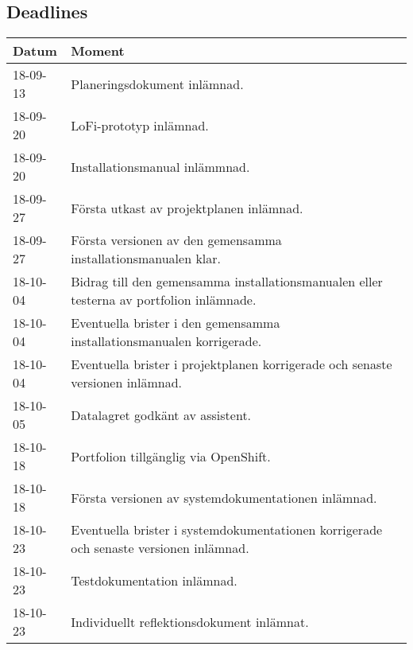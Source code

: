\documentclass{TDP003mall}
\begin{document}
\subsection{Deadlines}
\begin{table}[!h]
\begin{tabularx}{\linewidth}{|l|X|}\hline
    \textbf{Datum} & \textbf{Moment} \\\hline
    18-09-13 & Planeringsdokument inlämnad. \\\hline
    18-09-20 & LoFi-prototyp inlämnad. \\\hline
    18-09-20 & Installationsmanual inlämmnad. \\\hline
    18-09-27 & Första utkast av projektplanen inlämnad. \\\hline
    18-09-27 & Första versionen av den gemensamma installationsmanualen klar. \\\hline
    18-10-04 & Bidrag till den gemensamma installationsmanualen eller testerna av portfolion inlämnade. \\\hline
    18-10-04 & Eventuella brister i den gemensamma installationsmanualen korrigerade. \\\hline
    18-10-04 & Eventuella brister i projektplanen korrigerade och senaste versionen inlämnad. \\\hline
    18-10-05 & Datalagret godkänt av assistent. \\\hline
    18-10-18 & Portfolion tillgänglig via OpenShift. \\\hline
    18-10-18 & Första versionen av systemdokumentationen inlämnad. \\\hline
    18-10-23 & Eventuella brister i systemdokumentationen korrigerade och senaste versionen inlämnad. \\\hline
    18-10-23 & Testdokumentation inlämnad. \\\hline
    18-10-23 & Individuellt reflektionsdokument inlämnat. \\\hline
\end{tabularx}
\end{table}
\end{document}
